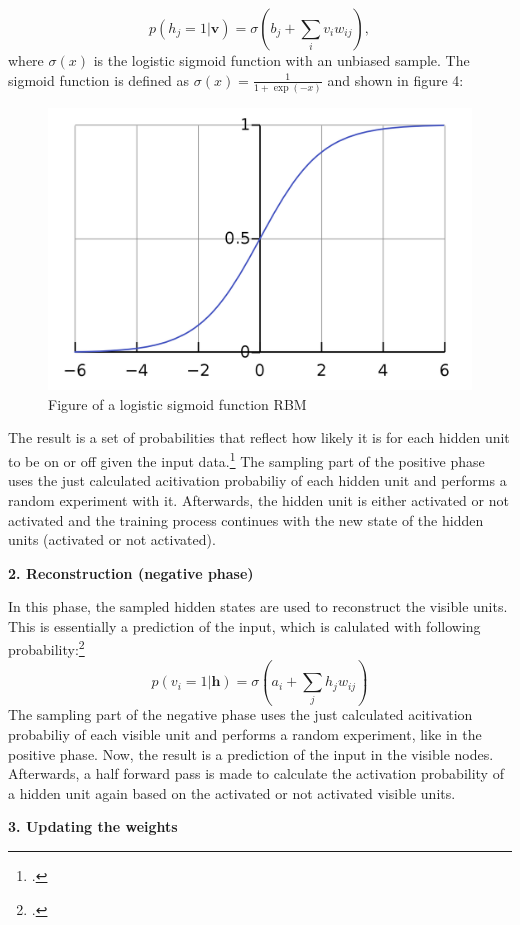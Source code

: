 \begin{equation}
p(h_j = 1 | \textbf{v}) = \sigma(b_j + \sum_i v_i w_{ij}),
\end{equation}
where $\sigma(x)$ is the logistic sigmoid function with an unbiased sample. The sigmoid function is defined as $\sigma(x) = \frac{1}{1 + \exp(-x)}$ and shown in figure 4:
\begin{figure}[H]
    \centering
    \includegraphics[width=0.5\linewidth]{graphics/logistic_sigmoid.png}
    \caption{Figure of a logistic sigmoid function \ac{RBM}}
\end{figure}
The result is a set of probabilities that reflect how likely it is for each hidden unit to be on or off given the input data.\footcite[cf.][6]{huembeliPhysicsEnergybasedModels2022}
The sampling part of the positive phase uses the just calculated acitivation probabiliy of each hidden unit and performs a random experiment with it.
Afterwards, the hidden unit is either activated or not activated and the training process continues with the new state of the hidden units (activated or not activated).

\textbf{2. Reconstruction (negative phase)}

In this phase, the sampled hidden states are used to reconstruct the visible units. 
This is essentially a prediction of the input, which is calulated with following probability:\footcite[cf.][6]{hintonPracticalGuideTraining2012}
\begin{equation}
    p(v_i = 1 | \mathbf{h}) = \sigma(a_i + \sum_j h_j w_{ij})
\end{equation}
The sampling part of the negative phase uses the just calculated acitivation probabiliy
of each visible unit and performs a random experiment, like in the positive phase.
Now, the result is a prediction of the input in the visible nodes.
Afterwards, a half forward pass is made to calculate the activation probability of a hidden unit again based on the activated or not activated visible units.

\textbf{3. Updating the weights}

